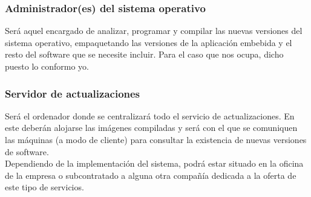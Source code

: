 \subsubsection{Administrador(es) del sistema operativo}

Será aquel encargado de analizar, programar y compilar las nuevas versiones del sistema operativo, empaquetando las versiones de la aplicación embebida y el resto del software que se necesite incluir. Para el caso que nos ocupa, dicho puesto lo conformo yo.

\subsubsection{Servidor de actualizaciones}
	
Será el ordenador donde se centralizará todo el servicio de actualizaciones. En este deberán alojarse las imágenes compiladas y será con el que se comuniquen las máquinas (a modo de cliente) para consultar la existencia de nuevas versiones de software.\\

Dependiendo de la implementación del sistema, podrá estar situado en la oficina de la empresa o subcontratado a alguna otra compañía dedicada a la oferta de este tipo de servicios.
	
\newpage
